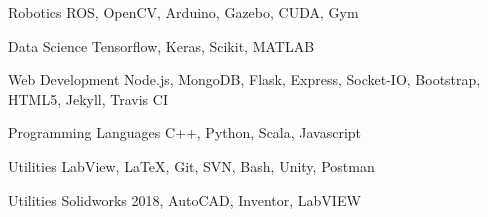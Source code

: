 
\begin{cvskills}

  \cvskill
    {Robotics}
    {ROS, OpenCV, Arduino, Gazebo, CUDA, Gym}

  \cvskill
    {Data Science} %
    {Tensorflow, Keras, Scikit, MATLAB} %

  \cvskill
    {Web Development} %
    {Node.js, MongoDB, Flask, Express, Socket-IO, Bootstrap, HTML5,  Jekyll, Travis CI} %

  \cvskill
    {Programming Languages} %
    {C++, Python, Scala, Javascript} %

  \cvskill
    {Utilities}
    {LabView, \LaTeX, Git, SVN, Bash, Unity, Postman}

  \cvskill
    {Utilities}
    {Solidworks 2018, AutoCAD, Inventor, LabVIEW}

\end{cvskills}
